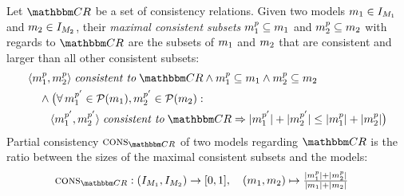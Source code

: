 \begin{definition} \label{def:partialconsistency}
    Let $\consistencyrelationset{CR}$ be a set of consistency relations.
    Given two models $\model{m}{1} \in \metamodelinstanceset{M}{1}$ and $\model{m}{2} \in \metamodelinstanceset{M}{2}$, their \emph{maximal consistent subsets} $\model{m}{1}^p \subseteq \model{m}{1}$ and $\model{m}{2}^p \subseteq \model{m}{2}$ with regards to $\consistencyrelationset{CR}$ are the subsets of $\model{m}{1}$ and $\model{m}{2}$ that are consistent and larger than all other consistent subsets:
    \begin{align*}
        & 
        \tupled{\model{m}{1}^p, \model{m}{2}^p} \consistenttomath \consistencyrelationset{CR} \land
        \model{m}{1}^p \subseteq \model{m}{1} \land \model{m}{2}^p \subseteq \model{m}{2}  \\
        & \formulaskip
        \land 
        \bigl( \forall \model{m}{1}^{p'} \in \mathcal{P}(\model{m}{1}), \model{m}{2}^{p'} \in \mathcal{P}(\model{m}{2}) : \\ %
        & \formulaskip\formulaskip
        \tupled{\model{m}{1}^{p'}, \model{m}{2}^{p'}} \consistenttomath \consistencyrelationset{CR} %
        \Rightarrow 
        \abs{\model{m}{1}^{p'}} + \abs{\model{m}{2}^{p'}} \leq \abs{\model{m}{1}^{p}} + \abs{\model{m}{2}^{p}} \bigr)
    \end{align*}
    Partial consistency $\function{cons}_{\consistencyrelationset{CR}}$ of two models regarding $\consistencyrelationset{CR}$ is the ratio between the sizes of the maximal consistent subsets and the models:
    \begin{align*}
        \function{cons}_{\consistencyrelationset{CR}}: \; 
        & (\metamodelinstanceset{M}{1}, \metamodelinstanceset{M}{2}) \rightarrow [0,1], \quad %
        (\model{m}{1}, \model{m}{2}) \mapsto \tfrac{\abs{\model{m}{1}^{p}} + \abs{\model{m}{2}^{p}}}{\abs{\model{m}{1}} + \abs{\model{m}{2}}}
    \end{align*}

\end{definition}

